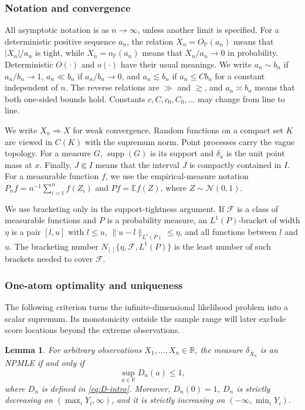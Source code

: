 \documentclass[11pt]{article}
\newtheorem{lemma}[theorem]{Lemma}
\theoremstyle{definition}
\numberwithin{equation}{section}
\newcommand{\E}{\mathbb{E}}
\newcommand{\R}{\mathbb{R}}
\newcommand{\cN}{\mathcal{N}}
\DeclareMathOperator{\supp}{supp}
\begin{document}
\subsubsection{Notation and convergence}

All asymptotic notation is as \(n\to\infty\), unless another limit is
specified. For a deterministic positive sequence \(a_n\), the relation
\(X_n=O_{\mathbb P}(a_n)\) means that \(|X_n|/a_n\) is tight, while
\(X_n=o_{\mathbb P}(a_n)\) means that \(X_n/a_n\to0\) in probability.
Deterministic \(O(\cdot)\) and \(o(\cdot)\) have their usual meanings. We
write \(a_n\sim b_n\) if \(a_n/b_n\to1\), \(a_n\ll b_n\) if
\(a_n/b_n\to0\), and \(a_n\lesssim b_n\) if \(a_n\le Cb_n\) for a constant
independent of \(n\). The reverse relations are \(\gg\) and \(\gtrsim\), and
\(a_n\asymp b_n\) means that both one-sided bounds hold. Constants
\(c,C,c_0,C_0,\dots\) may change from line to line.

We write \(X_n\Rightarrow X\) for weak convergence. Random functions on a
compact set \(K\) are viewed in \(C(K)\) with the supremum norm. Point
processes carry the vague topology. For a measure \(G\), \(\supp(G)\) is its
support and \(\delta_x\) is the unit point mass at \(x\). Finally,
\(J\Subset I\) means that the interval \(J\) is compactly contained in
\(I\).
For a measurable function \(f\), we use the empirical-measure notation
\(P_nf=n^{-1}\sum_{i=1}^nf(Z_i)\) and \(Pf=\E f(Z)\), where
\(Z\sim\cN(0,1)\).

We use bracketing only in the support-tightness argument. If \(\mathcal F\)
is a class of measurable functions and \(P\) is a probability measure, an
\(L^1(P)\)-bracket of width \(\eta\) is a pair \([l,u]\) with \(l\le u\),
\(\|u-l\|_{L^1(P)}\le\eta\), and all functions between \(l\) and \(u\).
The bracketing number \(N_{[]}\{\eta,\mathcal F,L^1(P)\}\) is the least
number of such brackets needed to cover \(\mathcal F\).

\subsubsection{One-atom optimality and uniqueness}

The following criterion turns the infinite-dimensional likelihood problem
into a scalar supremum. Its monotonicity outside the sample range will later
exclude score locations beyond the extreme observations.
\begin{lemma}
\label{lem:one-atom-D}
For arbitrary observations \(X_1,\dots,X_n\in\R\), the measure
\(\delta_{\bar X_n}\) is an NPMLE if and only if
\[
    \sup_{a\in\R}D_n(a)\le1,
\]
where \(D_n\) is defined in \eqref{eq:D-intro}. Moreover, \(D_n(0)=1\),
\(D_n\) is strictly decreasing on \((\max_iY_i,\infty)\), and it is strictly
increasing on \((-\infty,\min_iY_i)\).
\end{lemma}
\end{document}
